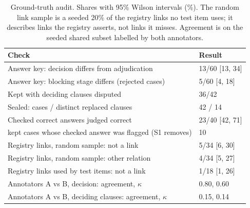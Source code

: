 \begin{table}[t]\centering\small
\caption{Ground-truth audit. Shares with 95\% Wilson intervals (\%). The random link sample is a seeded 20\% of the registry links no test item uses; it describes links the registry asserts, not links it misses. Agreement is on the seeded shared subset labelled by both annotators.}
\label{tab:audit}
\begin{tabular}{p{6.2cm}l}
\toprule
Check & Result \\
\midrule
Answer key: decision differs from adjudication & 13/60 [13, 34] \\
Answer key: blocking stage differs (rejected cases) & 5/60 [4, 18] \\
Kept with deciding clauses disputed & 36/42 \\
Sealed: cases / distinct replaced clauses & 42 / 14 \\
Checked correct answers judged correct & 23/40 [42, 71] \\
\quad kept cases whose checked answer was flagged (S1 removes) & 10 \\
Registry links, random sample: not a link & 5/34 [6, 30] \\
Registry links, random sample: other relation & 4/34 [5, 27] \\
Registry links used by test items: not a link & 1/18 [1, 26] \\
Annotators A vs B, decision: agreement, $\kappa$ & 0.80, 0.60 \\
Annotators A vs B, deciding clauses: agreement, $\kappa$ & 0.15, 0.14 \\
\bottomrule
\end{tabular}
\end{table}
